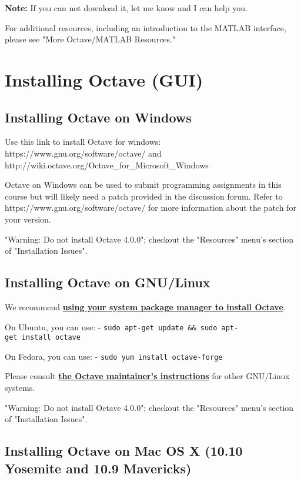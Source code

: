 \documentclass[11pt]{article}
\begin{document}
\textbf{Note:} If you can not download it, let me know and I can help
you.

For additional resources, including an introduction to the MATLAB
interface, please see "More Octave/MATLAB Resources."

\section{Installing Octave (GUI)}\label{installing-octave-gui}

\subsection{Installing Octave on
Windows}\label{installing-octave-on-windows}

Use this link to install Octave for windows:
https://www.gnu.org/software/octave/ and
http://wiki.octave.org/Octave\_for\_Microsoft\_Windows

Octave on Windows can be used to submit programming assignments in this
course but will likely need a patch provided in the discussion forum.
Refer to https://www.gnu.org/software/octave/ for more information about
the patch for your version.

"Warning: Do not install Octave 4.0.0"; checkout the "Resources" menu's
section of "Installation Issues".

\subsection{Installing Octave on
GNU/Linux}\label{installing-octave-on-gnulinux}

We recommend
\textbf{\href{http://wiki.octave.org/Octave_for_GNU/Linux}{using your
system package manager to install Octave}}.

On Ubuntu, you can use: -
\texttt{sudo\ apt-get\ update\ \&\&\ sudo\ apt-get\ install\ octave}

On Fedora, you can use: - \texttt{sudo\ yum\ install\ octave-forge}

Please consult
\textbf{\href{http://wiki.octave.org/Octave_for_GNU/Linux}{the Octave
maintainer's instructions}} for other GNU/Linux systems.

"Warning: Do not install Octave 4.0.0"; checkout the "Resources" menu's
section of "Installation Issues".

\subsection{Installing Octave on Mac OS X (10.10 Yosemite and 10.9
Mavericks)}\label{installing-octave-on-mac-os-x-10.10-yosemite-and-10.9-mavericks}
\end{document}
